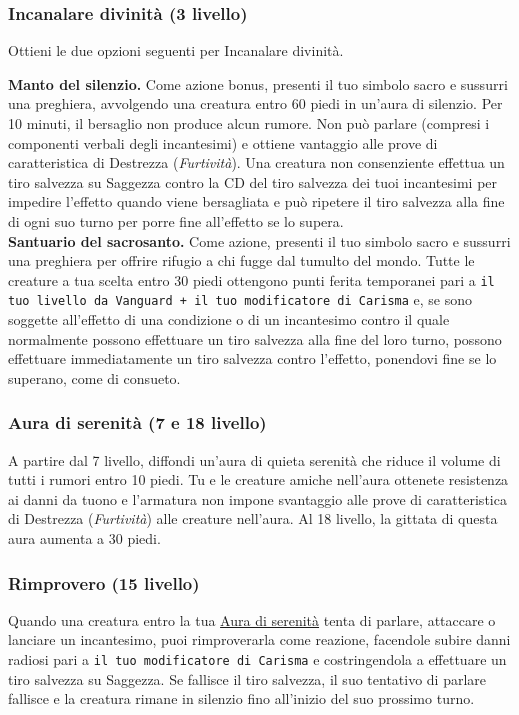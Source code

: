 \documentclass[a4paper,10pt,twoside,twocolumn,openany,bg=full,nodeprecatedcode]{dndbook}
\begin{document}
\subsubsection{Incanalare divinità (3\degree{} livello)}\label{incanalare_divinit_3_livello_2}
Ottieni le due opzioni seguenti per Incanalare divinità.

\textbf{Manto del silenzio.} Come azione bonus, presenti il tuo simbolo sacro e sussurri una preghiera, avvolgendo una creatura entro 60 piedi in un'aura di silenzio. Per 10 minuti, il bersaglio non produce alcun rumore. Non può parlare (compresi i componenti verbali degli incantesimi) e ottiene vantaggio alle prove di caratteristica di Destrezza (\emph{Furtività}). Una creatura non consenziente effettua un tiro salvezza su Saggezza contro la CD del tiro salvezza dei tuoi incantesimi per impedire l'effetto quando viene bersagliata e può ripetere il tiro salvezza alla fine di ogni suo turno per porre fine all'effetto se lo supera. \\ \textbf{Santuario del sacrosanto.} Come azione, presenti il tuo simbolo sacro e sussurri una preghiera per offrire rifugio a chi fugge dal tumulto del mondo. Tutte le creature a tua scelta entro 30 piedi ottengono punti ferita temporanei pari a \texttt{il tuo livello da Vanguard + il tuo modificatore di Carisma} e, se sono soggette all'effetto di una condizione o di un incantesimo contro il quale normalmente possono effettuare un tiro salvezza alla fine del loro turno, possono effettuare immediatamente un tiro salvezza contro l'effetto, ponendovi fine se lo superano, come di consueto.

\subsubsection{Aura di serenità (7\degree{} e 18\degree{} livello)}\label{Oath_of_the_Exemplar_aura_of_serenity}
A partire dal 7\degree{} livello, diffondi un'aura di quieta serenità che riduce il volume di tutti i rumori entro 10 piedi. Tu e le creature amiche nell'aura ottenete resistenza ai danni da tuono e l'armatura non impone svantaggio alle prove di caratteristica di Destrezza (\emph{Furtività}) alle creature nell'aura. Al 18\degree{} livello, la gittata di questa aura aumenta a 30 piedi.

\subsubsection{Rimprovero (15\degree{} livello)}\label{Oath_of_the_Exemplar_rebuke}
Quando una creatura entro la tua \hyperref[Oath_of_the_Exemplar_aura_of_serenity]{Aura di serenità} tenta di parlare, attaccare o lanciare un incantesimo, puoi rimproverarla come reazione, facendole subire danni radiosi pari a \texttt{il tuo modificatore di Carisma} e costringendola a effettuare un tiro salvezza su Saggezza. Se fallisce il tiro salvezza, il suo tentativo di parlare fallisce e la creatura rimane in silenzio fino all'inizio del suo prossimo turno.
\end{document}
